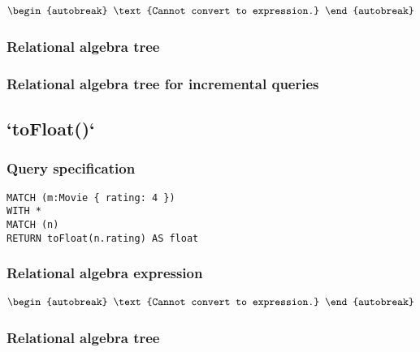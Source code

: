 \begin{align*}
\begin{autobreak}
\text{Cannot convert to expression.}
\end{autobreak}
\end{align*}

\subsubsection*{Relational algebra tree}


\subsubsection*{Relational algebra tree for incremental queries}


\subsection{`toFloat()`}

\subsubsection*{Query specification}

\begin{lstlisting}
MATCH (m:Movie { rating: 4 })
WITH *
MATCH (n)
RETURN toFloat(n.rating) AS float
\end{lstlisting}

\subsubsection*{Relational algebra expression}

\begin{align*}
\begin{autobreak}
\text{Cannot convert to expression.}
\end{autobreak}
\end{align*}

\subsubsection*{Relational algebra tree}


